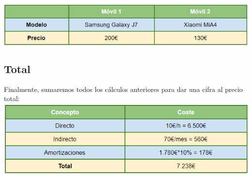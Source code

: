 \includegraphics[width=\textwidth]{img/cap4/moviles.jpg}


\subsection{Total}	

Finalmente, sumaremos todos los cálculos anteriores para dar una cifra al precio total:\\

\includegraphics[width=\textwidth]{img/cap4/total.png}



	

	